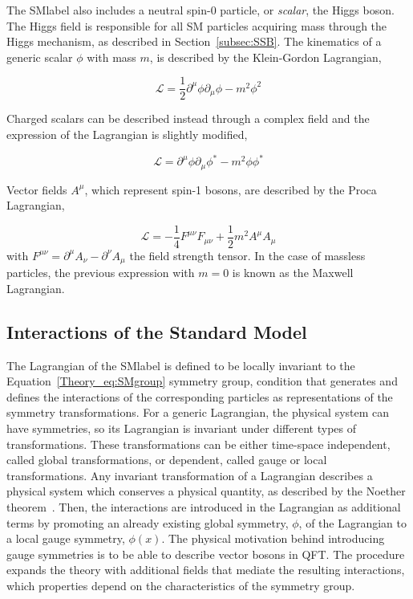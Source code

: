 The \acrshort{SMlabel} also includes a neutral spin-0 particle, or \textit{scalar}, the Higgs boson. The Higgs field is responsible for all SM particles acquiring mass through the Higgs mechanism, as described in Section~\ref{subsec:SSB}.
The kinematics of a generic scalar $\phi$ with mass $m$, is described by the Klein-Gordon Lagrangian,

\begin{equation}
    \label{Theory_eq:KGeq}
    \mathcal{L}=\frac{1}{2}\partial^\mu\phi\partial_\mu\phi - m^2\phi^2
\end{equation}

Charged scalars can be described instead through a complex field and the expression of the Lagrangian is slightly modified,

\begin{equation}
    \label{Theory_eq:KGeqcharged}
    \mathcal{L}=\partial^\mu\phi\partial_\mu\phi^* - m^2\phi\phi^*
\end{equation}

Vector fields $A^\mu$, which represent spin-1 bosons, are described by the Proca Lagrangian,

\begin{equation}
    \label{Theory_eq:Proca}
    \mathcal{L}=-\frac{1}{4}F^{\mu\nu}F_{\mu\nu}+\frac{1}{2}m^2A^\mu A_\mu
\end{equation}
with $F^{\mu\nu}=\partial^\mu A_\nu -\partial^\nu A_\mu$ the field strength tensor.
In the case of massless particles, the previous expression with $m=0$ is known as the Maxwell Lagrangian.

\subsection{Interactions of the Standard Model}
\label{subsec:SMinteractions}
The Lagrangian of the \acrshort{SMlabel} is defined to be locally invariant to the Equation~\ref{Theory_eq:SMgroup} symmetry group,
condition that generates and defines the interactions of the corresponding particles as representations of the symmetry transformations.
For a generic Lagrangian, the physical system can have symmetries, so its Lagrangian is invariant under different types of transformations.
These transformations can be either time-space independent, called global transformations, or dependent, called gauge or local transformations.
Any invariant transformation of a Lagrangian describes a physical system which conserves a physical quantity, as described by the Noether theorem~\cite{Noether}.
Then, the interactions are introduced in the Lagrangian as additional terms by promoting an already existing global symmetry, $\phi$,
of the Lagrangian to a local gauge symmetry, $\phi(x)$. The physical motivation behind introducing gauge symmetries
is to be able to describe vector bosons in \acrshort{QFT}.
The procedure expands the theory with additional fields that mediate the resulting interactions,
which properties depend on the characteristics of the symmetry group.


